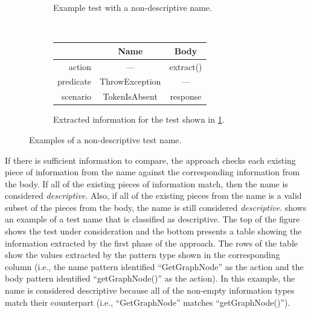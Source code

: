 \documentclass[proposal.tex]{subfiles}
\begin{document}
\begin{figure}[t]
    \centering
    \begin{subfigure}{0.8\textwidth}
    \centering
        \caption{Example test with a non-descriptive name.}
        \label{PatternExample_detectedPoorName_code}
    \end{subfigure}
    \\[0.5ex]
    \begin{subfigure}{0.9\textwidth}
    \centering
        \begin{tabular}{rcc}
        \toprule
                  & Name           & Body      \\
        \midrule
        action    & ---            & extract() \\
        predicate & ThrowException & ---       \\
        scenario  & TokenIsAbsent  & response  \\
        \bottomrule
        \end{tabular}
        \caption{Extracted information for the test shown in \cref{PatternExample_detectedPoorName_code}.}
        \label{PatternExample_detectedPoorName}
    \end{subfigure}
    \caption{Examples of a non-descriptive test name.}
    \label{fig:non-descriptive-examples}
\end{figure}


If there is sufficient information to compare, the approach checks each existing piece of information from the name against the corresponding information from the body.
%
If all of the existing pieces of information match, then the name is considered \emph{descriptive}.
Also, if all of the existing pieces from the name is a valid subset of the pieces from the body, the name is still considered \emph{descriptive}.
%
 shows an example of a test name that is classified as descriptive.
%
The top of the figure shows the test under consideration and the bottom presents a table showing the information extracted by the first phase of the approach.
%
The rows of the table show the values extracted by the pattern type shown in the corresponding column (i.e., the name pattern identified \enquote{GetGraphNode} as the action and the body pattern identified \enquote{getGraphNode()} as the action).
%
In this example, the name is considered descriptive because all of the non-empty information types match their counterpart (i.e., \enquote{GetGraphNode} matches \enquote{getGraphNode()}).
\end{document}
